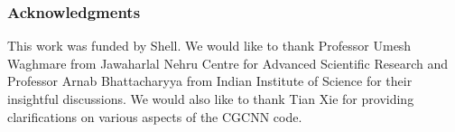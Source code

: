 \documentclass{article}
\newcommand{\baseline}[1]{CGCNN}
\begin{document}
\subsubsection*{Acknowledgments}
This work was funded by Shell. We would like to thank Professor Umesh Waghmare from Jawaharlal Nehru Centre for Advanced Scientific Research and Professor Arnab Bhattacharyya from Indian Institute of Science for their insightful discussions. We would also like to thank Tian Xie for providing clarifications on various aspects of the \baseline{} code. 


\end{document}
